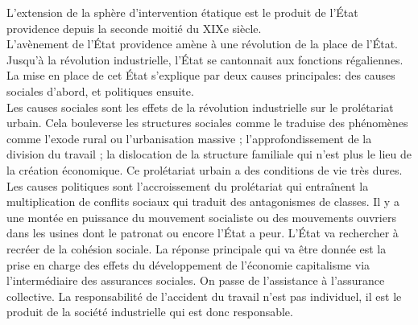 \documentclass[10pt, a4paper, openany]{book}
\begin{document}
L'extension de la sphère d'intervention étatique est le produit de l'État providence depuis la seconde moitié du XIXe siècle. \\
L'avènement de l'État providence amène à une révolution de la place de l'État. Jusqu'à la révolution industrielle, l'État se cantonnait aux fonctions régaliennes. La mise en place de cet État s'explique par deux causes principales: des causes sociales d'abord, et politiques ensuite. \\
Les causes sociales sont les effets de la révolution industrielle sur le prolétariat urbain. Cela bouleverse les structures sociales comme le traduise des phénomènes comme l'exode rural ou l'urbanisation massive ; l'approfondissement de la division du travail ; la dislocation de la structure familiale qui n'est plus le lieu de la création économique. Ce prolétariat urbain a des conditions de vie très dures. \\
Les causes politiques sont l'accroissement du prolétariat qui entraînent la multiplication de conflits sociaux qui traduit des antagonismes de classes. Il y a une montée en puissance du mouvement socialiste ou des mouvements ouvriers dans les usines dont le patronat ou encore l'État a peur. L'État va rechercher à recréer de la cohésion sociale. La réponse principale qui va être donnée est la prise en charge des effets du développement de l'économie capitalisme via l'intermédiaire des assurances sociales. On passe de l'assistance à l'assurance collective. La responsabilité de l'accident du travail n'est pas individuel, il est le produit de la société industrielle qui est donc responsable.
\end{document}
